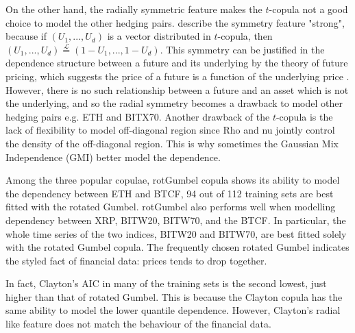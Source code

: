 On the other hand, the radially symmetric feature makes the $t$-copula not a good choice to model the other hedging pairs.
\cite{demarta2005t} describe the symmetry feature "strong", because if $(U_1, ..., U_d)$ is a vector distributed in $t$-copula,
then $(U_1, ..., U_d) \overset{\mathcal{L}}= (1-U_1, ..., 1-U_d)$.
This symmetry can be justified in the dependence structure between a future and its underlying by the theory of future pricing,
which suggests the price of a future is a function of the underlying price \citep{hull2003options}.
However, there is no such relationship between a future and an asset which is not the underlying, and so the radial symmetry becomes a drawback to model other hedging pairs e.g. ETH and BITX70.
Another drawback of the $t$-copula is the lack of flexibility to model off-diagonal region since Rho and nu jointly control the density of the off-diagonal region.
This is why sometimes the Gaussian Mix Independence (GMI) better model the dependence.  \medskip

Among the three popular copulae, rotGumbel copula shows its ability to model the dependency between ETH and BTCF,
94 out of 112 training sets are best fitted with the rotated Gumbel.
rotGumbel also performs well when modelling dependency between XRP, BITW20, BITW70, and the BTCF.
In particular, the whole time series of the two indices, BITW20 and BITW70, are best fitted solely with the rotated Gumbel copula.
The frequently chosen rotated Gumbel indicates the styled fact of financial data: prices tends to drop together.  \medskip




In fact, Clayton's AIC in many of the training sets is the second lowest, just higher than that of rotated Gumbel.
This is because the Clayton copula has the same ability to model the lower quantile dependence.
However, Clayton's radial like feature does not match the behaviour of the financial data. \medskip

